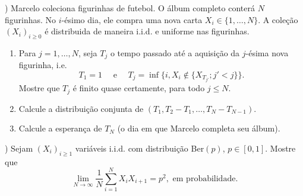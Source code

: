 \documentclass{article}
\begin{document}
\medskip

\pagebreak

) Marcelo coleciona figurinhas de futebol. O \'album completo conter\'a $N$ figurinhas. No $i$-\'esimo dia, ele compra uma nova carta $X_i \in \{1, \dots, N\}$. A cole\c{c}\~ao $(X_i)_{i \geq 0}$ \'e distribuida de maneira i.i.d. e uniforme nas figurinhas.
\begin{enumerate}[\quad a)]
  \item Para $j = 1, \dots, N$, seja $T_j$ o tempo passado at\'e a aquisi\c{c}\~ao da $j$-\'esima nova figurinha, i.e.
    \begin{equation}
      T_1 = 1 \quad \text{ e } \quad T_j = \inf\{i, X_i \not \in \{X_{T_{j'}}; j' < j\}\}.
    \end{equation}
  Mostre que $T_j$ \'e finito quase certamente, para todo $j \leq N$.
  \item Calcule a distribui\c{c}\~ao conjunta de $(T_1, T_2 - T_1, \dots, T_N - T_{N-1})$.
  \item Calcule a esperan\c{c}a de $T_N$ (o dia em que Marcelo completa seu \'album).
\end{enumerate}

) Sejam $(X_i)_{i \geq 1}$ vari\'aveis i.i.d. com distribui\c{c}\~ao Ber$(p)$, $p \in [0,1]$. Mostre que
\begin{equation}
  \lim_{N \to \infty} \frac 1N \sum_{i = 1}^N X_i X_{i+1} = p^2, \text{ em probabilidade.}
\end{equation}
\end{document}
